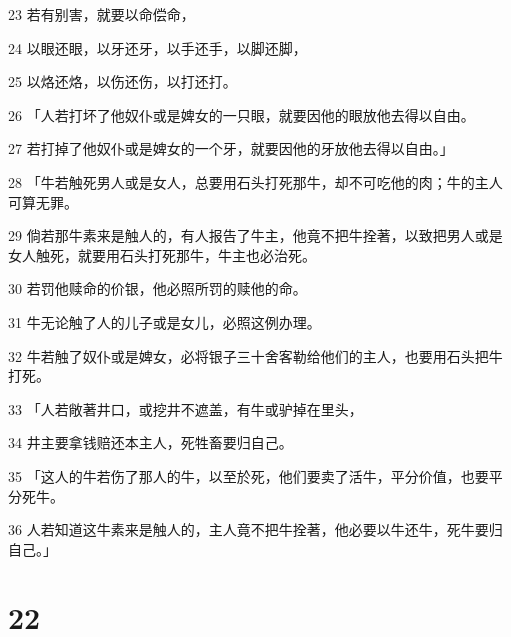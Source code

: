 \par 23 若有别害，就要以命偿命，
\par 24 以眼还眼，以牙还牙，以手还手，以脚还脚，
\par 25 以烙还烙，以伤还伤，以打还打。
\par 26 「人若打坏了他奴仆或是婢女的一只眼，就要因他的眼放他去得以自由。
\par 27 若打掉了他奴仆或是婢女的一个牙，就要因他的牙放他去得以自由。」
\par 28 「牛若触死男人或是女人，总要用石头打死那牛，却不可吃他的肉；牛的主人可算无罪。
\par 29 倘若那牛素来是触人的，有人报告了牛主，他竟不把牛拴著，以致把男人或是女人触死，就要用石头打死那牛，牛主也必治死。
\par 30 若罚他赎命的价银，他必照所罚的赎他的命。
\par 31 牛无论触了人的儿子或是女儿，必照这例办理。
\par 32 牛若触了奴仆或是婢女，必将银子三十舍客勒给他们的主人，也要用石头把牛打死。
\par 33 「人若敞著井口，或挖井不遮盖，有牛或驴掉在里头，
\par 34 井主要拿钱赔还本主人，死牲畜要归自己。
\par 35 「这人的牛若伤了那人的牛，以至於死，他们要卖了活牛，平分价值，也要平分死牛。
\par 36 人若知道这牛素来是触人的，主人竟不把牛拴著，他必要以牛还牛，死牛要归自己。」

\chapter{22}

